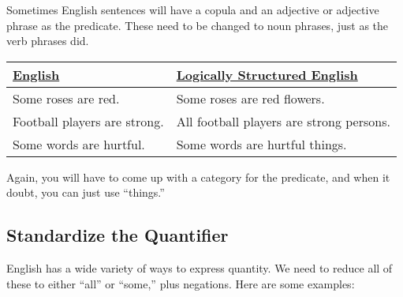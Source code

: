 \noindent Sometimes English sentences will have a copula and an adjective or adjective phrase as the predicate. These need to be changed to noun phrases, just as the verb phrases did.

\begin{table}
\begin{longtabu}{p{.5\linewidth}p{.5\linewidth}}
\underline{English} &
\underline{Logically Structured English}  \\
\endhead
Some roses are red. &
Some roses are red flowers. \\

Football players are strong. &
All football players are strong persons. \\

Some words are hurtful. &
Some words are hurtful things.
\end{longtabu}
\end{table}

\noindent Again, you will have to come up with a category for the predicate, and when it doubt, you can just use ``things.''

\subsection{Standardize the Quantifier}
\label{subsec:standardize_quantifier}

English has a wide variety of ways to express quantity. We need to reduce all of these to either ``all'' or ``some,'' plus negations.  Here are some examples:

